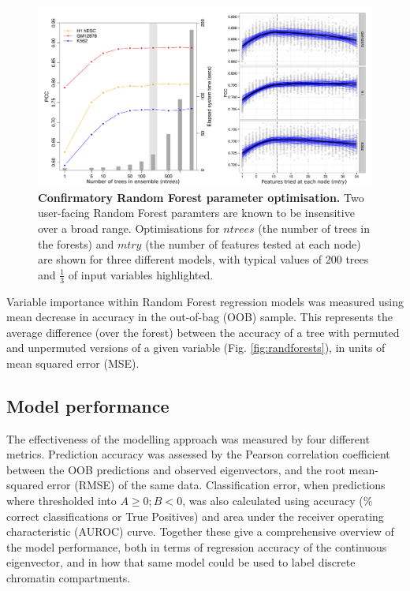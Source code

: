 \documentclass[a4paper,10pt,oneside]{book}
\begin{document}
\begin{figure}
\begin{center}
\includegraphics[width=\textwidth]{figs/rfparams.pdf}
\captionsetup{width=\textwidth}
\caption{ {\bf Confirmatory Random Forest parameter optimisation. } 
Two user-facing Random Forest paramters are known to be insensitive over a broad range.\cite{Hastie2001} Optimisations for $ntrees$ (the number of trees in the forests) and $mtry$ (the number of features tested at each node) are shown for three different models, with typical values of 200 trees and $\frac{1}{3}$ of input variables highlighted.
}\label{fig:rfparam}
\end{center}
\end{figure} 

Variable importance within Random Forest regression models was measured
using mean decrease in accuracy in the out-of-bag (OOB) sample. This
represents the average difference (over the forest) between the accuracy
of a tree with permuted and unpermuted versions of a given variable (Fig. \ref{fig:randforests}), in
units of mean squared error (MSE).\citep{Cutler2007, Dasgupta2012}

\subsection{Model performance}\label{model-performance}

The effectiveness of the modelling approach was measured by four
different metrics. Prediction accuracy was assessed by the Pearson
correlation coefficient between the OOB predictions and observed eigenvectors, and the root mean-squared
error (RMSE) of the same data. Classification error, when predictions
where thresholded into $A \geq 0; B < 0$, was also calculated using
accuracy (\% correct classifications or True Positives) and area under
the receiver operating characteristic (AUROC) curve. Together these give
a comprehensive overview of the model performance, both in terms of
regression accuracy of the continuous eigenvector, and in how that same
model could be used to label discrete chromatin compartments.
\end{document}
